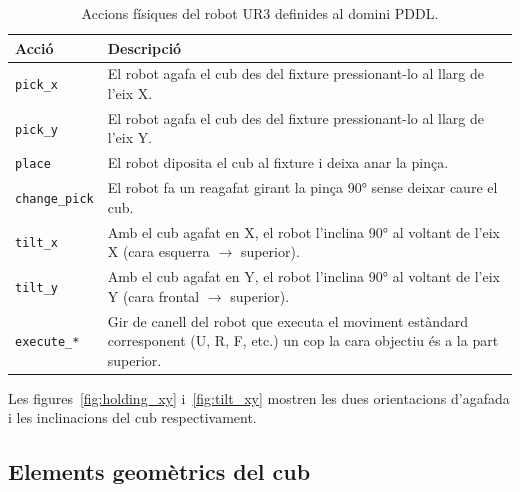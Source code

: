 \documentclass[12pt, a4paper]{article}
\begin{document}
\begin{table}[H]
  \centering
  \begin{tabular}{lp{9cm}}
    \toprule
    \textbf{Acció} & \textbf{Descripció} \\
    \midrule
    \texttt{pick\_x}     & El robot agafa el cub des del fixture pressionant-lo al llarg de l'eix X. \\
    \texttt{pick\_y}     & El robot agafa el cub des del fixture pressionant-lo al llarg de l'eix Y. \\
    \texttt{place}       & El robot diposita el cub al fixture i deixa anar la pinça. \\
    \texttt{change\_pick}& El robot fa un reagafat girant la pinça 90° sense deixar caure el cub. \\
    \texttt{tilt\_x}     & Amb el cub agafat en X, el robot l'inclina 90° al voltant de l'eix X (cara esquerra $\to$ superior). \\
    \texttt{tilt\_y}     & Amb el cub agafat en Y, el robot l'inclina 90° al voltant de l'eix Y (cara frontal $\to$ superior). \\
    \texttt{execute\_*}  & Gir de canell del robot que executa el moviment estàndard corresponent (U, R, F, etc.) un cop la cara objectiu és a la part superior. \\
    \bottomrule
  \end{tabular}
  \caption{Accions físiques del robot UR3 definides al domini PDDL.}
  \label{tab:robot_actions}
\end{table}

Les figures~\ref{fig:holding_xy} i~\ref{fig:tilt_xy} mostren les dues orientacions d'agafada i les inclinacions del cub respectivament.

\label{fig:holding_xy}

\label{fig:tilt_xy}

\subsection{Elements geomètrics del cub}
\end{document}

